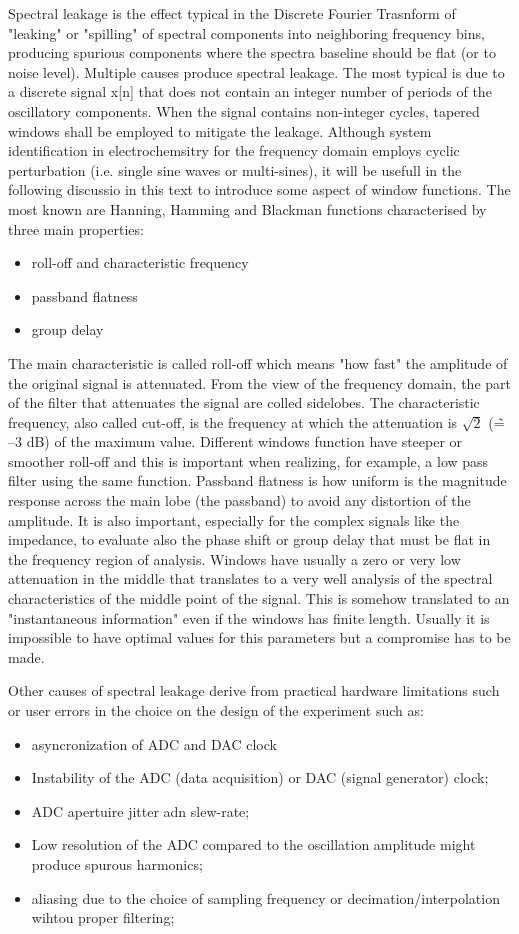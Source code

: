 Spectral leakage is the effect typical in the Discrete Fourier Trasnform of "leaking" or "spilling" of spectral components into neighboring frequency bins, producing spurious components where the spectra baseline should be flat (or to noise level). Multiple causes produce spectral leakage. The most typical is due to a discrete signal x[n] that does not contain an integer number of periods of the oscillatory components. When the signal contains non-integer cycles, tapered windows shall be employed to mitigate the leakage. Although system identification in electrochemsitry for the frequency domain employs cyclic perturbation (i.e. single sine waves or multi-sines), it will be usefull in the following discussio in this text to introduce some aspect of window functions. The most known are Hanning, Hamming and Blackman  functions characterised by three main properties:
\begin{itemize}
    \item roll-off and characteristic frequency
    \item passband flatness
    \item group delay
\end{itemize}
The main characteristic is called roll-off which means "how fast" the amplitude of the original signal is attenuated. From the view of the frequency domain, the part of the filter that attenuates the signal are colled sidelobes. The characteristic frequency, also called cut-off, is the frequency at which the attenuation is $\sqrt{2}$ (\~= –3 dB) of the maximum value. Different windows function have steeper or smoother roll-off and this is important when realizing, for example, a low pass filter using the same function. Passband flatness is how uniform is the magnitude response across the main lobe (the passband) to avoid any distortion of the amplitude.
It is also important, especially for the complex signals like the impedance, to evaluate also the phase shift or group delay that must be flat in the frequency region of analysis. Windows have usually a zero or very low attenuation in the middle that translates to a very well analysis of the spectral characteristics of the middle point of the signal. This is somehow translated to an "instantaneous information" even if the windows has finite length.
Usually it is impossible to have optimal values for this parameters but a compromise has to be made.

Other causes of spectral leakage derive from practical hardware limitations such or user errors in the choice on the design of the experiment such as:
\begin{itemize}
    \item asyncronization of ADC and DAC clock
    \item Instability of the ADC (data acquisition) or DAC (signal generator) clock;
    \item ADC apertuire jitter adn slew-rate;
    \item Low resolution of the ADC compared to the oscillation amplitude might produce spurous harmonics;
    \item aliasing due to the choice of sampling frequency or decimation/interpolation wihtou proper filtering;
\end{itemize}

